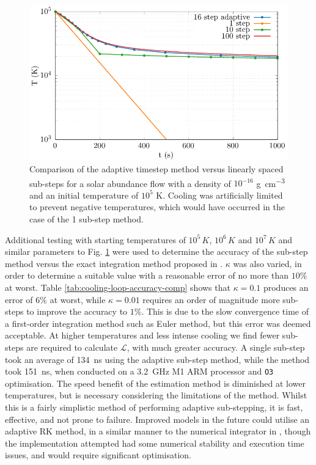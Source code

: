 \begin{figure}[ht]
  \centering
  \includegraphics{assets/plasma-cooling-benchmarks/evolution.pdf}
  \caption[Cooling sub-step method evolution comparison]{Comparison of the adaptive timestep method versus linearly spaced sub-steps for a solar abundance flow with a density of $10^{-16}$ \si{\gram\per\centi\metre\cubed} and an initial temperature of $10^5$ \si{\kelvin}. Cooling was artificially limited to prevent negative temperatures, which would have occurred in the case of the 1 sub-step method.}
  \label{fig:cooling-loop-evolution}
\end{figure}

Additional testing with starting temperatures of $10^5 \, \si{K}$, $10^6 \, \si{K}$ and $10^7 \, \si{K}$ and similar parameters to Fig. \ref{fig:cooling-loop-evolution} were used to determine the accuracy of the sub-step method versus the exact integration method proposed in \textcite{townsendExactIntegrationScheme2009}.
$\kappa$ was also varied, in order to determine a suitable value with a reasonable error of no more than $10\%$ at worst. 
Table \ref{tab:cooling-loop-accuracy-comp} shows that $\kappa = 0.1$ produces an error of $6\%$ at worst, while $\kappa = 0.01$ requires an order of magnitude more sub-steps to improve the accuracy to $1\%$.
This is due to the slow convergence time of a first-order integration method such as Euler method, but this error was deemed acceptable.
At higher temperatures and less intense cooling we find fewer sub-steps are required to calculate $\mathcal{L}$, with much greater accuracy.
A single sub-step took an average of \SI{134}{\nano\second} using the adaptive sub-step method, while the \textcite{townsendExactIntegrationScheme2009} method took \SI{151}{\nano\second}, when conducted on a \SI{3.2}{\giga\hertz} M1 ARM processor and \texttt{O3} optimisation.
The speed benefit of the estimation method is diminished at lower temperatures, but is necessary considering the limitations of the \textcite{townsendExactIntegrationScheme2009} method.
Whilst this is a fairly simplistic method of performing adaptive sub-stepping, it is fast, effective, and not prone to failure.
Improved models in the future could utilise an adaptive RK method, in a similar manner to the numerical integrator in \athena{}, though the implementation attempted had some numerical stability and execution time issues, and would require significant optimisation.

